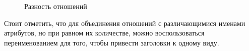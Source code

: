 \begin{itemize}
\begin{figure}[H]
		      \caption{Разность отношений}
		      \label{set-minus-ex}
	      \end{figure}
\end{itemize}

Стоит отметить, что для объединения отношений с различающимися именами атрибутов, но при равном их
количестве, можно воспользоваться переименованием для того, чтобы привести заголовки к одному виду.
